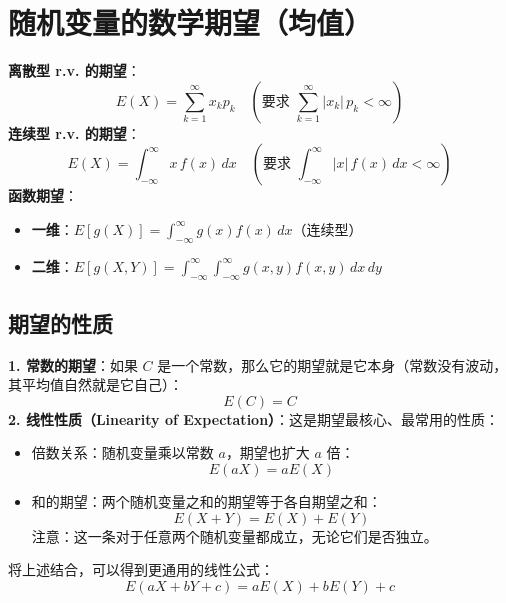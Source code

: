 \section{随机变量的数学期望（均值）}
\begin{definition}[数学期望]
\textbf{离散型 r.v. 的期望}：
\begin{equation}
	E(X) = \sum_{k=1}^{\infty} x_k p_k \quad \left(\text{要求 } \sum_{k=1}^{\infty} |x_k|\,p_k < \infty\right)
	\label{eq:第四章:离散期望}
\end{equation}
\textbf{连续型 r.v. 的期望}：
\begin{equation}
	E(X) = \int_{-\infty}^{\infty} x\,f(x)\,dx \quad \left(\text{要求 } \int_{-\infty}^{\infty} |x|\,f(x)\,dx < \infty\right)
	\label{eq:第四章:连续期望}
\end{equation}
\textbf{函数期望}：
\begin{itemize}
	\item \textbf{一维}：$E[g(X)] = \int_{-\infty}^{\infty} g(x) f(x)\,dx$（连续型）
	\item \textbf{二维}：$E[g(X, Y)] = \int_{-\infty}^{\infty} \int_{-\infty}^{\infty} g(x, y) f(x, y)\,dx\,dy$
\end{itemize}
\end{definition}

\subsection{期望的性质}
\begin{property}[常数与线性性质]
\textbf{1. 常数的期望}：如果 $C$ 是一个常数，那么它的期望就是它本身（常数没有波动，其平均值自然就是它自己）：
\begin{equation}
	E(C) = C
	\label{eq:第四章:常数期望}
\end{equation}
\textbf{2. 线性性质（Linearity of Expectation）}：这是期望最核心、最常用的性质：
\begin{itemize}
	\item 倍数关系：随机变量乘以常数 $a$，期望也扩大 $a$ 倍：
	\begin{equation}
		E(aX) = aE(X)
		\label{eq:第四章:倍数}
	\end{equation}
	\item 和的期望：两个随机变量之和的期望等于各自期望之和：
	\begin{equation}
		E(X + Y) = E(X) + E(Y)
		\label{eq:第四章:和的期望}
	\end{equation}
	注意：这一条对于任意两个随机变量都成立，无论它们是否独立。
\end{itemize}
将上述结合，可以得到更通用的线性公式：
\begin{equation}
	E(aX + bY + c) = aE(X) + bE(Y) + c
	\label{eq:第四章:线性组合}
\end{equation}
\end{property}

